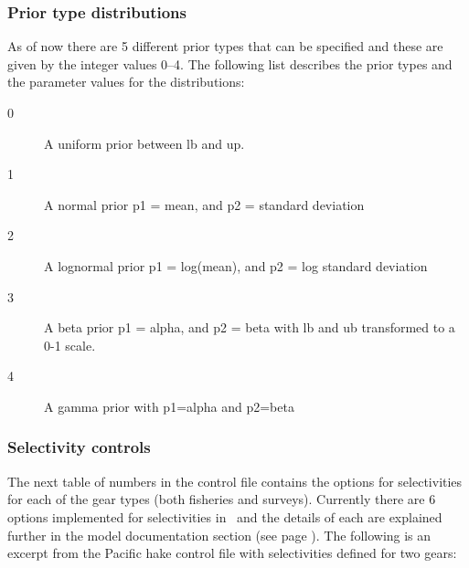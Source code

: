 \begin{multicols}{2}
%	
\subsubsection{Prior type distributions}
As of now there are 5 different prior types that can be specified and these are given by the integer values 0--4.  The following list describes the prior types and the parameter values for the distributions:
\begin{description}
\item[0] A uniform prior between lb and up. 
\item[1] A normal prior p1 = mean, and p2 = standard deviation
\item[2] A lognormal prior p1 = log(mean), and p2 = log standard deviation
\item[3] A beta prior p1 = alpha, and p2 = beta with lb and ub transformed to a 0-1 scale.
\item[4] A gamma prior with p1=alpha and p2=beta
\end{description}


\subsubsection{Selectivity controls}
The next table of numbers in the control file contains the options for selectivities for each of the gear types (both fisheries and surveys).  Currently there are 6 options implemented for selectivities in \iscam\, and the details of each are explained further in the model documentation section (see page \pageref{ModelDocSelectivity}).  The following is an excerpt from the Pacific hake control file with selectivities defined for two gears:


\end{multicols}
